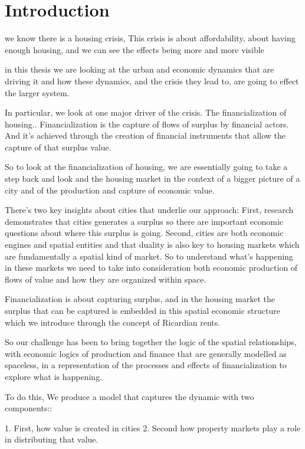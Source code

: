 \documentclass[]{article}
\begin{document}
 
\section{Introduction}

we know there is a housing crisis, 
This crisis is about affordability, about having enough housing, 
and we can see the effects being more and more visible 

in this thesis we are looking at the urban and economic dynamics that are driving it and how  these dynamics, and the  crisis they lead to, are going to effect the larger system.

In particular, we look at one major driver of the crisis. The financialization of housing.. 
Financialization is the capture of flows of surplus by financial actors. And it's achieved through the creation of financial instruments that allow the capture of that surplus value. 

So to look at the financialization of housing,  we are essentially going to take a step back
and look and the housing market in the context of a bigger picture of a city and of the production and capture of economic value.

There's two key insights about cities that underlie our approach: 
First, research demonstrates that cities  generates a surplus so there are important economic questions about where this surplus is going. 
Second, cities are both economic engines and spatial entities and that duality is also key to housing markets which are fundamentally a spatial kind of market. So to understand what's happening in these markets we need to take into consideration both economic production of flows of value and how they are organized within space. 

Financialization 
is about capturing surplus, and 
in the housing market the surplus that can be captured is embedded in this spatial economic structure which we introduce through the concept of Ricardian rents. 

So our challenge has been to bring together the logic of the spatial relationships,  with economic logics of production and finance that are generally modelled as spaceless,  in a representation of the processes and effects of  financialization to explore  what is happening.

To do this,  We produce a model that captures the dynamic with two components::


 1. First, how value is created in cities 
 2. Second how property markets play a role in distributing that value. 
\end{document}
